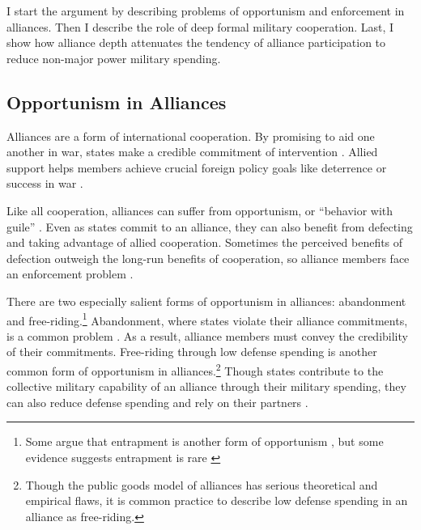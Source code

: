 \documentclass[12pt]{article}
\begin{document}
I start the argument by describing problems of opportunism and enforcement in alliances. 
Then I describe the role of deep formal military cooperation. 
Last, I show how alliance depth attenuates the tendency of alliance participation to reduce non-major power military spending. 


\subsection{Opportunism in Alliances}

Alliances are a form of international cooperation. 
By promising to aid one another in war, states make a credible commitment of intervention \citep{Fearon1997, Morrow2000}. 
Allied support helps members achieve crucial foreign policy goals like deterrence or success in war \citep{Walt1990, Snyder1997}. 


Like all cooperation, alliances can suffer from opportunism, or ``behavior with guile'' \citep{Williamson1985}. 
Even as states commit to an alliance, they can also benefit from defecting and taking advantage of allied cooperation. 
Sometimes the perceived benefits of defection outweigh the long-run benefits of cooperation, so alliance members face an enforcement problem \citep{Fearon1998a, Koremenosetal2001}.


There are two especially salient forms of opportunism in alliances: abandonment and free-riding.\footnote{Some argue that entrapment is another form of opportunism \citep{Snyder1984}, but some evidence suggests entrapment is rare \citep{Kim2011, Beckley2015}}
Abandonment, where states violate their alliance commitments, is a common problem \citep{BerkemeierFuhrmann2018}.
As a result, alliance members must convey the credibility of their commitments. 
Free-riding through low defense spending is another common form of opportunism in alliances.\footnote{Though the public goods model of alliances has serious theoretical and empirical flaws, it is common practice to describe low defense spending in an alliance as free-riding.}
Though states contribute to the collective military capability of an alliance through their military spending, they can also reduce defense spending and rely on their partners \citep{OlsonZeckhauser1966, Morrow1993, Conybeare1994, SandlerHartley2001}.
\end{document}
